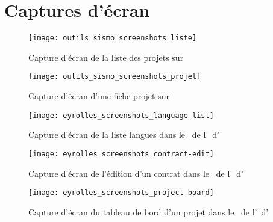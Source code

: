 \appendix

\chapter{Captures d'écran}
\label{section:annexes_screenshots}

\begin{figure}[h]
	\centering
	\texttt{[image: outils\_sismo\_screenshots\_liste]}
	\caption{Capture d'écran de la liste des projets sur \asismo}
	\label{figure:outils_sismo_screenshots_liste}
\end{figure}

\begin{figure}[h]
	\centering
	\texttt{[image: outils\_sismo\_screenshots\_projet]}
	\caption{Capture d'écran d'une fiche projet sur \asismo}
	\label{figure:outils_sismo_screenshots_projet}
\end{figure}

\begin{figure}[h]
	\centering
	\texttt{[image: eyrolles\_screenshots\_language-list]}
	\caption{Capture d'écran de la liste langues dans le \alotdeux\ de l'\aintranet\ d'\aey}
	\label{figure:eyrolles_screenshots_language-list}
\end{figure}

\begin{figure}[h]
	\centering
	\texttt{[image: eyrolles\_screenshots\_contract-edit]}
	\caption{Capture d'écran de l'édition d'un contrat dans le \alotdeux\ de l'\aintranet\ d'\aey}
	\label{figure:eyrolles_screenshots_contract-edit}
\end{figure}

\begin{figure}[h]
	\centering
	\texttt{[image: eyrolles\_screenshots\_project-board]}
	\caption{Capture d'écran du tableau de bord d'un projet dans le \alotdeux\ de l'\aintranet\ d'\aey}
	\label{figure:eyrolles_screenshots_project-board}
\end{figure}
